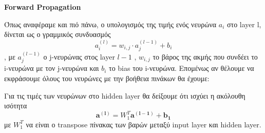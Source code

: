 \documentclass[a4paper,12pt]{article}
\begin{document}
\newpage
\section*{}
\begin{center}
    \Large \textbf{Forward Propagation}
\end{center}

Όπως αναφέραμε και πιό πάνω, ο υπολογισμός της τιμής ενός νευρώνα $a_i$ στο layer l, δίνεται ως ο γραμμικός συνδυασμός 
\begin{equation}
a_{i}^{(l)} = w_{i,j} \cdot a_{j}^{(l-1)} + b_i \label{eq:linear}
\end{equation}
,  με $a_{j}^{(l-1)}$ ο j-νευρώνας στος layer $l-1$ , $w_{i,j}$ το βάρος της ακμής που συνδέει το i-νευρώνα με τον j-νευρώνα και $b_i$ το bias του i-νευρώνα. Επομένως αν θέλουμε να εκφράσουμε όλους του νευρώνες με την βοήθεια πινάκων θα έχουμε:

Για τις τιμές των νευρώνων στο hidden layer θα δείξουμε ότι ισχύει η ακόλουθη ισότητα
\begin{equation}
\mathbf{a^{(l)}} = W_{1}^{T} \mathbf{a^{(l-1)}} + \mathbf{b_1} \label{eq:forwardprop}
\end{equation}
με $W_{1}^{T}$ να είναι ο transpose πίνακας των βαρών μεταξύ input layer και hidden layer.
\end{document}
